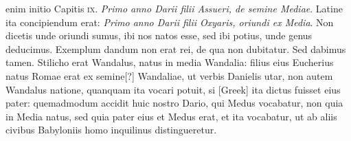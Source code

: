 enim initio Capitis \textsc{ix}.
\textit{Primo anno Darii filii Assueri, de semine
Mediae}.
Latine ita concipiendum erat: \textit{Primo anno Darii filii Oxyaris,
oriundi ex Media}.
Non dicetis unde oriundi sumus, ibi nos natos
esse, sed ibi potius, unde genus deducimus.
Exemplum dandum
non erat rei, de qua non dubitatur.
Sed dabimus tamen.
Stilicho
erat Wandalus, natus in media Wandalia: filius eius Eucherius natus
Romae erat ex semine[?] Wandaliae, ut verbis Danielis utar, non autem
Wandalus natione, quanquam ita vocari potuit, si \textgreek{[Greek]}
ita dictus fuisset eius pater: quemadmodum accidit huic nostro
Dario, qui Medus vocabatur, non quia in Media natus, sed
quia pater eius et Medus erat, et ita vocabatur, ut ab aliis civibus
Babyloniis homo inquilinus distingueretur.

